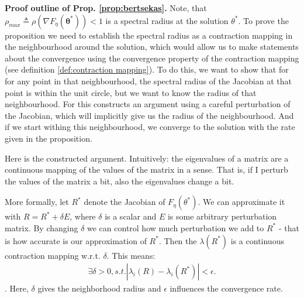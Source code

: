 \documentclass{article}
\renewcommand{\vec}[1]{\ensuremath{\boldsymbol{#1}}}
\begin{document}
\textbf{Proof outline of Prop. \ref{prop:bertsekas}.} 
Note, that $\rho_{max} \triangleq \rho (\nabla F_\eta (\vec{\theta}^*)) < 1$ is a spectral radius at the solution $\theta^*$. To prove the   proposition we need to establish the spectral radius as a contraction mapping in the  neighbourhood around the solution, which would allow us to make statements about the convergence using the convergence property of the contraction mapping (see definition \ref{def:contraction mapping}). To do this, we want to show that for for any point in that neighbourhood, the spectral radius of the Jacobian at that point is within the unit circle, but we want to know the radius of that neighbourhood. For this \cite{Bertsekas/99} constructs an argument using a careful perturbation of the Jacobian, which will implicitly give us the radius of the neighbourhood. And if we start withing this neighbourhood, we converge to the solution with the rate given in the proposition.

Here is the constructed argument.
Intuitively: the eigenvalues of a matrix are a continuous mapping of the values of the matrix in a sense. That is, if I perturb the values of the matrix a bit, also the eigenvalues change a bit.

More formally, let $R^*$ denote the Jacobian of $F_\eta(\theta^*)$. We can approximate it with $R=R^*+\delta E$, where $\delta$ is a scalar and $E$ is some arbitrary perturbation matrix. By changing  $\delta$ we can control how much perturbation we add to $R^*$ - that is how accurate is our approximation of $R^*$. Then the $\lambda(R^*)$ is a continuous contraction mapping w.r.t. $\delta$. This means:
\begin{align*}
\exists \delta > 0, s.t.
    |\lambda_i(R)-\lambda_i(R^*)|<\epsilon.
\end{align*}.
Here, $\delta$ gives the neighborhood radius and $\epsilon$ influences the convergence rate.
\end{document}
